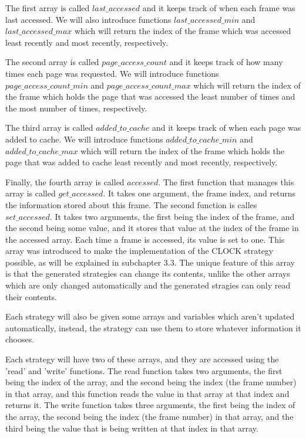 The first array is called $last\_accessed$ and it keeps track of when each frame was last accessed. We will also introduce functions $last\_accessed\_min$ and $last\_accessed\_max$ which will return the index of the frame which was accessed least recently and most recently, respectively.

The second array is called $page\_access\_count$ and it keeps track of how many times each page was requested. We will introduce functions $page\_access\_count\_min$ and $page\_access\_count\_max$ which will return the index of the frame which holds the page that was accessed the least number of times and the most number of times, respectively.

The third array is called $added\_to\_cache$ and it keeps track of when each page was added to cache. We will introduce functions $added\_to\_cache\_min$ and $added\_to\_cache\_max$ which will return the index of the frame which holds the page that was added to cache least recently and most recently, respectively.

Finally, the fourth array is called $accessed$. The first function that manages this array is called $get\_accessed$. It takes one argument, the frame index, and returns the information stored about this frame. The second function is calles $set\_accessed$. It takes two arguments, the first being the index of the frame, and the second being some value, and it stores that value at the index of the frame in the accessed array. Each time a frame is accessed, its value is set to one. This array was introduced to make the implementation of the CLOCK strategy possible, as will be explained in subchapter 3.3. The unique feature of this array is that the generated strategies can change its contents, unlike the other arrays which are only changed automatically and the generated stragies can only read their contents.

Each strategy will also be given some arrays and variables which aren't updated automatically, instead, the strategy can use them to store whatever information it chooses. 

Each strategy will have two of these arrays, and they are accessed using the 'read' and 'write' functions. The read function takes two arguments, the first being the index of the array, and the second being the index (the frame number) in that array, and this function reads the value in that array at that index and returns it. The write function takes three arguments, the first being the index of the array, the second being the index (the frame number) in that array, and the third being the value that is being written at that index in that array.

